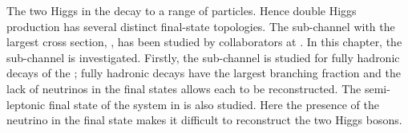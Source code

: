 


The two Higgs in the  \eeToHH decay to a range of particles. Hence  double Higgs production has several distinct final-state topologies. The sub-channel with the largest cross section, \eeToHHbbbb, has been studied by  collaborators at \CERN. In this chapter, the \eeToHHbbWW sub-channel  is investigated. Firstly, the \eeToHHbbWW sub-channel is studied for fully hadronic decays of the \WW; fully hadronic \WW decays have the largest branching fraction and the lack of neutrinos in the final states allows each \PW to be reconstructed. The semi-leptonic final state of the \WW system in \eeToHHbbWW is also studied. Here the presence of the neutrino in the final state makes it  difficult to reconstruct the two Higgs bosons.





